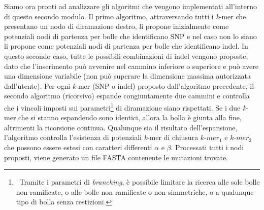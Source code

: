 \documentclass[../main.tex]{subfiles}
\begin{document}
\noindent
Siamo ora pronti ad analizzare gli algoritmi che vengono implementati all'interno di questo secondo modulo. Il primo algoritmo, attraversando tutti i \textit{k}-mer che presentano un nodo di diramazione destro, li propone inizialmente come potenziali nodi di partenza per bolle che identificano SNP e nel caso non lo siano li propone come potenziali nodi di partenza per bolle che identificano indel. In questo secondo caso, tutte le possibili combinazioni di indel vengono proposte, dato che l'inserimento può avvenire nel cammino inferiore o superiore e può avere una dimensione variabile (non può superare la dimensione massima autorizzata dall'utente). Per ogni \textit{k}-mer (SNP o indel) proposto dall'algoritmo precedente, il secondo algoritmo (ricorsivo) espande congiuntamente due cammini e controlla che i vincoli imposti sui parametri\footnote{\ Tramite i parametri di \textit{branching}, è possibile limitare la ricerca alle sole bolle non ramificate, o alle bolle non ramificate o non simmetriche, o a qualunque tipo di bolla senza restizioni.} di diramazione siano rispettati. Se i due \textit{k}-mer che si stanno espandendo sono identici, allora la bolla è giunta alla fine, altrimenti la ricorsione continua. Qualunque sia il risultato dell'espansione, l'algoritmo controlla l'esistenza di potenziali \textit{k}-mer di chiusura $k\texttt{-}mer_1$ e $k\texttt{-}mer_2$ che possono essere estesi con caratteri differenti $\alpha$ e $\beta$. Processati tutti i nodi proposti, viene generato un file FASTA contenente le mutazioni trovate.
\end{document}
